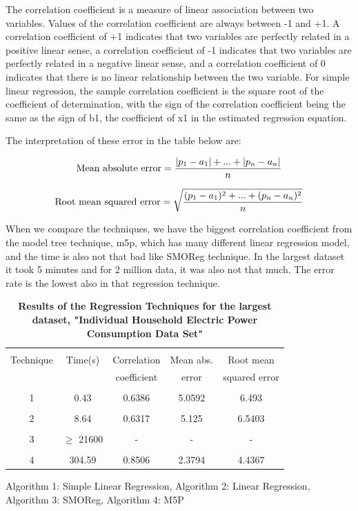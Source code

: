 \documentclass[a4paper]{article}
\begin{document}
The correlation coefficient is a measure of linear association between two variables. Values of the correlation coefficient are always between -1 and +1. A correlation coefficient of +1 indicates that two variables are perfectly related in a positive linear sense, a correlation coefficient of -1 indicates that two variables are perfectly related in a negative linear sense, and a correlation coefficient of 0 indicates that there is no linear relationship between the two variable. For simple linear regression, the sample correlation coefficient is the square root of the coefficient of determination, with the sign of the correlation coefficient being the same as the sign of b1, the coefficient of x1 in the estimated regression equation.

The interpretation of these error in the table below are:

\begin{equation*}
    \textnormal{Mean absolute error} = \frac{|p_1 - a_1| + ... + |p_n - a_n|}{n}
\end{equation*}

\begin{equation*}
    \textnormal{Root mean squared error} =\sqrt{ \frac{(p_1 - a_1)^2 + ... + (p_n - a_n)^2}{n} }
\end{equation*}

When we compare the techniques, we have the biggest correlation coefficient from the model tree technique, m5p, which has many different linear regression model, and the time is also not that bad like SMOReg technique. In the largest dataset it took 5 minutes and for 2 million data, it was also not that much. The error rate is the lowest also in that regression technique. 

\begin{table}[b]
\begin{tabular}{| c | c | c |c |c |}
\hline & & & & \\
Technique & Time(s) & Correlation & Mean abs.  & Root mean \\
 & & coefficient & error & squared error  \\
\hline & & & &  \\
1  & 0.43  & 0.6386  & 5.0592  & 6.493  \\ 
\hline & & & & \\
2  & 8.64  & 0.6317  & 5.125  &  6.5403 \\ 
\hline & & & & \\
3  & $\ge$ 21600  & - & - & - \\ 
\hline & & & & \\
4  &  304.59 &  0.8506 & 2.3794 & 4.4367 \\ 
\hline
\end{tabular}
\caption{\textbf{Results of the Regression Techniques for the largest dataset, "Individual Household Electric Power Consumption Data Set" }}
    Algorithm 1: Simple Linear Regression,
    Algorithm 2: Linear Regression,
    Algorithm 3: SMOReg,
    Algorithm 4: M5P
\end{table}
\end{document}
